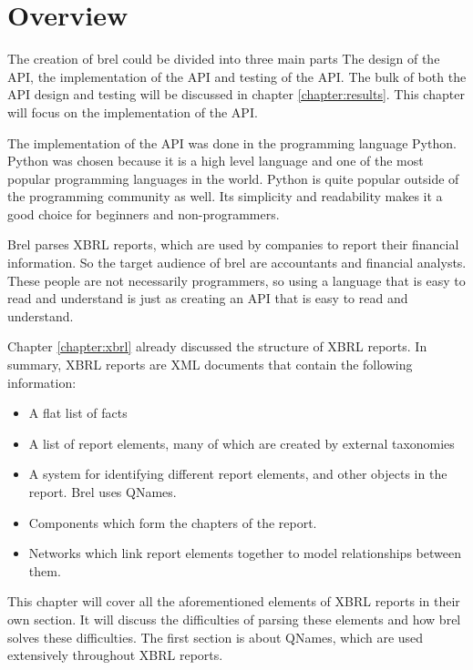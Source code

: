 \section{Overview}

The creation of brel could be divided into three main parts 
The design of the API, the implementation of the API and testing of the API.
The bulk of both the API design and testing will be discussed in chapter \ref{chapter:results}.
This chapter will focus on the implementation of the API.

The implementation of the API was done in the programming language Python.
Python was chosen because it is a high level language and one of the most popular programming languages in the world.
Python is quite popular outside of the programming community as well.
Its simplicity and readability makes it a good choice for beginners and non-programmers.

Brel parses XBRL reports, which are used by companies to report their financial information.
So the target audience of brel are accountants and financial analysts.
These people are not necessarily programmers, 
so using a language that is easy to read and understand is just as creating an API that is easy to read and understand.

Chapter \ref{chapter:xbrl} already discussed the structure of XBRL reports. 
In summary, XBRL reports are XML documents that contain the following information:

\begin{itemize}
    \item A flat list of facts
    \item A list of report elements, many of which are created by external taxonomies
    \item A system for identifying different report elements, and other objects in the report.
    Brel uses QNames.
    \item Components which form the chapters of the report.
    \item Networks which link report elements together to model relationships between them.
\end{itemize}

This chapter will cover all the aforementioned elements of XBRL reports in their own section.
It will discuss the difficulties of parsing these elements and how brel solves these difficulties.
The first section is about QNames, which are used extensively throughout XBRL reports.
